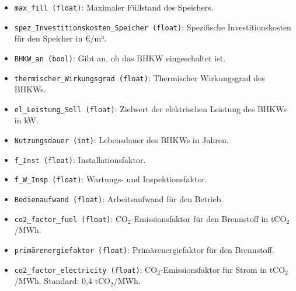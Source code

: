 \begin{itemize}
    \item \texttt{max\_fill (float)}: Maximaler Füllstand des Speichers.
    \item \texttt{spez\_Investitionskosten\_Speicher (float)}: Spezifische Investitionskosten für den Speicher in €/m³.
    \item \texttt{BHKW\_an (bool)}: Gibt an, ob das BHKW eingeschaltet ist.
    \item \texttt{thermischer\_Wirkungsgrad (float)}: Thermischer Wirkungsgrad des BHKWs.
    \item \texttt{el\_Leistung\_Soll (float)}: Zielwert der elektrischen Leistung des BHKWs in kW.
    \item \texttt{Nutzungsdauer (int)}: Lebensdauer des BHKWs in Jahren.
    \item \texttt{f\_Inst (float)}: Installationsfaktor.
    \item \texttt{f\_W\_Insp (float)}: Wartungs- und Inspektionsfaktor.
    \item \texttt{Bedienaufwand (float)}: Arbeitsaufwand für den Betrieb.
    \item \texttt{co2\_factor\_fuel (float)}: CO$_2$-Emissionsfaktor für den Brennstoff in tCO$_2$/MWh.
    \item \texttt{primärenergiefaktor (float)}: Primärenergiefaktor für den Brennstoff.
    \item \texttt{co2\_factor\_electricity (float)}: CO$_2$-Emissionsfaktor für Strom in tCO$_2$/MWh. Standard: 0,4 tCO$_2$/MWh.
\end{itemize}

